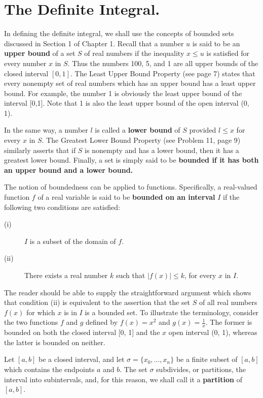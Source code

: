 \section{The Definite Integral.}
 In defining the definite integral, we shall use the concepts of bounded
sets discussed in Section 1 of Chapter 1. Recall that a number $u$ is said to be an \textbf{upper bound} of a set $S$ of real numbers if the inequality $x \leq u$ is satisfied for every number $x$ in $S$. Thus the numbers 100, 5, and 1 are all upper bounds of the closed interval $[0, 1]$. The Least Upper Bound Property (see page 7) states that every nonempty set of real numbers which has an upper bound has a least upper bound. For example, the number 1 is obviously the least upper bound of the interval [0,1]. Note that 1 is also the least upper bound of the open interval (0, 1).

In the same way, a number $l$ is called a \textbf{lower bound} of $S$ provided $l \leq x$ for every $x$ in $S$.  The Greatest Lower Bound Property (see Problem 11, page 9) similarly asserts that if $S$ is nonempty and has a lower bound, then it has a greatest lower bound. Finally, a set is simply said to be \textbf{bounded if it has both an upper bound and a lower bound.}

The notion of boundedness can be applied to functions. Specifically, a real-valued function $f$ of a real variable is said to be \textbf{bounded on an interval} $I$ if the following two conditions are satisfied:

\begin{description}
\item[(i)] $I$ is a subset of the domain of $f$.
\item[(ii)] There exists a real number $k$ such that $|f(x)| \leq k$, for every $x$ in $I$.

\end{description}

\noindent The reader should be able to supply the straightforward argument which shows that condition (ii) is equivalent to the assertion that the set $S$ of all real numbers $f(x)$ for which $x$ is in $I$ is a bounded set. To illustrate the terminology, consider the two functions $f$ and $g$ defined by $f(x) = x^2$ and $g(x) = \frac{1}{x}$. The former is bounded on both the closed interval [0, 1] and the $x$ open interval (0, 1), whereas the latter is bounded on neither.

Let $[a, b]$ be a closed interval, and let $\sigma = \{ x_0, . . ., x_n \}$ be a finite subset of $[a, b]$ which contains the endpoints $a$ and $b$. The set $\sigma$ subdivides, or partitions, the interval into subintervals, and, for this reason, we shall call it a \textbf{partition} of $[a, b]$.

